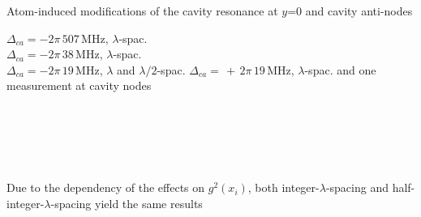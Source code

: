 \documentclass{beamer}
\begin{document}
\begin{frame}{Atom-induced modifications of the cavity resonance {\tiny at $y$=0 and cavity anti-nodes}}
\begin{minipage}{0.57\textwidth}
\begin{minipage}{0.35\textwidth}
			\vfill
		\end{minipage}
		\hspace{-2.5em}
		\begin{minipage}{0.75\textwidth}
			\footnotesize
			\textcolor[rgb]{0.729, 0.302, 0.235}{$\Delta_{ca}=-2\pi\,507\,$MHz, $\lambda$-spac.}\\
			\textcolor[rgb]{0.361, 0.643, 0.294}{$\Delta_{ca}=-2\pi\,38\,$MHz, $\lambda$-spac.}\\
			\textcolor[rgb]{0.553, 0.231, 0.376}{$\Delta_{ca}=-2\pi\,19\,$MHz, $\lambda$ and $\lambda/2$-spac.}
			\textcolor[rgb]{0.263, 0.443, 0.953}{$\Delta_{ca}=\,+\,2\pi\,19\,$MHz, $\lambda$-spac. and one\\ \makebox[26pt]{}measurement at cavity nodes}
		\end{minipage}\\~\\~\\~\\
		\begin{minipage}{\textwidth}
			\centering
			\begin{minipage}{0.9\textwidth}
				Due to the dependency of the effects on $g^2(x_i)$, both integer-$\lambda$-spacing and half-integer-$\lambda$-spacing yield the same results
			\end{minipage}
		\end{minipage}
		\vspace{2em}
	\end{minipage}

\end{frame}
\end{document}
